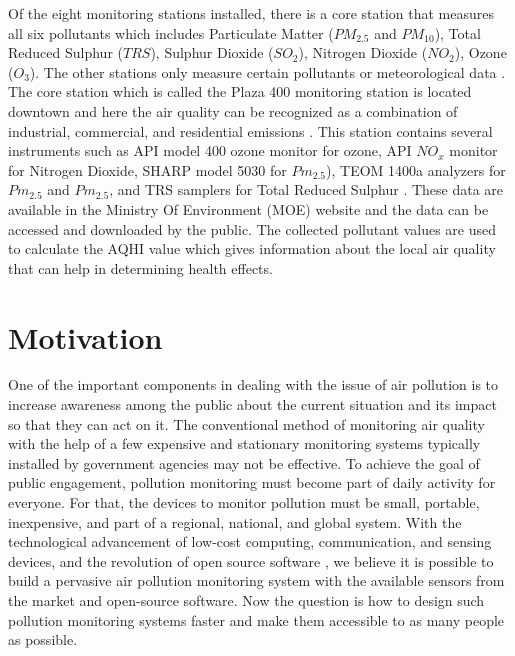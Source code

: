  Of the eight monitoring stations installed, there is a core station that measures all six pollutants which includes Particulate Matter ($PM_{2.5}$ and $PM_{10}$), Total Reduced Sulphur ($TRS$), Sulphur Dioxide ($SO_{2}$), Nitrogen Dioxide ($NO_2$), Ozone (${O_3}$). The other stations only measure certain pollutants or meteorological data \cite{Environment2016}. The core station which is called the Plaza 400 monitoring station is located downtown and here the air quality can be recognized as a combination of industrial, commercial, and residential emissions \cite{Authority2011}. This station contains several instruments such as  API model 400 ozone monitor for ozone, API $NO_{x}$ monitor for Nitrogen Dioxide, SHARP model 5030 for $Pm_{2.5}$), TEOM 1400a analyzers for $Pm_{2.5}$ and $Pm_{2.5}$, and TRS samplers for Total Reduced Sulphur \cite{Environment2016}\cite{Authority2011}. These data are available in the Ministry Of Environment (MOE) \cite{ MOE2020} website and the data can be accessed and downloaded by the public. The collected pollutant values are used to calculate the AQHI value which gives information about the local air quality that can help in determining health effects. %
 


\section{Motivation}

One of the important components in dealing with the issue of air pollution is to increase awareness among the public about the current situation and its impact so that they can act on it. The conventional method of monitoring air quality with the help of a few expensive and stationary monitoring systems typically installed by government agencies may not be effective. To achieve the goal of public engagement, pollution monitoring must become part of daily activity for everyone. For that, the devices to monitor pollution must be small, portable, inexpensive, and part of a regional, national, and global system. With the technological advancement of low-cost computing, communication, and sensing devices, and the revolution of open source software \cite{Anthes2016}, we believe it is possible to build a pervasive air pollution monitoring system with the available sensors from the market and open-source software. Now the question is how to design such pollution monitoring systems faster and make them accessible to as many people as possible. 

